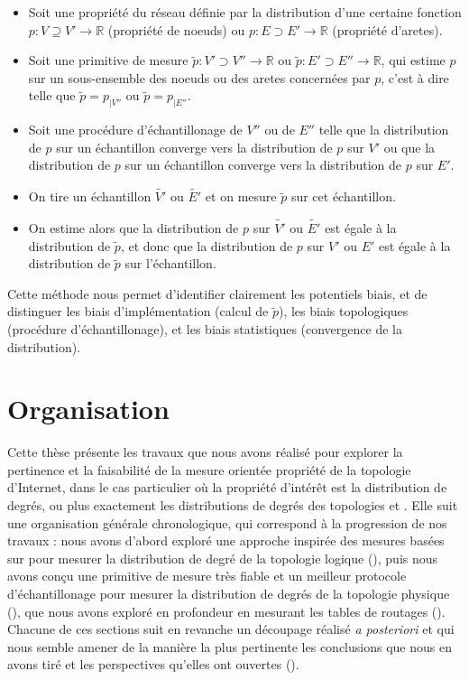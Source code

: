 \begin{itemize}
  \item Soit une propriété du réseau définie par la distribution d'une
  certaine fonction $p :
  V \supseteq V' \rightarrow {\mathbb R}$ (propriété de noeuds) ou $p : E
  \supset E' \rightarrow {\mathbb R}$ (propriété d'aretes).
  \item Soit une primitive de mesure $\tilde{p} : V' \supset V'' \rightarrow
  {\mathbb R}$ ou $\tilde{p} : E' \supset E'' \rightarrow {\mathbb R}$, qui
  estime $p$ sur un sous-ensemble des noeuds ou des aretes concernées par $p$,
  c'est à dire telle que $\tilde{p} = p_{|V''}$ ou $\tilde{p} = p_{|E''}$.
  \item Soit une procédure d'échantillonage de $V''$ ou de $E''$ telle que la
  distribution de $p$ sur un échantillon converge vers la distribution de
  $p$ sur $V'$ ou que la distribution de $p$ sur un échantillon converge vers la
  distribution de $p$ sur $E'$.
  \item On tire un échantillon $\tilde{V'}$ ou $\tilde{E'}$ et on mesure
  $\tilde{p}$ sur cet échantillon.
  \item On estime alors que la distribution de $p$ sur $\tilde{V'}$ ou
  $\tilde{E'}$ est égale à la distribution de $\tilde{p}$, et donc que la
  distribution de $p$ sur $V'$ ou $E'$ est égale à la distribution de
  $\tilde{p}$ sur l'échantillon.
\end{itemize}

Cette méthode nous permet d'identifier clairement les potentiels biais, et de
distinguer les biais d'implémentation (calcul de $\tilde{p}$), les biais
topologiques (procédure d'échantillonage), et les biais statistiques
(convergence de la distribution).

\section{Organisation}

Cette thèse présente les travaux que nous avons réalisé pour explorer la
pertinence et la faisabilité de la mesure orientée propriété de la topologie
d'Internet, dans le cas particulier où la propriété d'intérêt est la
distribution de degrés, ou plus exactement les distributions de degrés des
topologies \LL et \LLL.
Elle suit une organisation générale chronologique, qui correspond à la
progression de nos travaux : nous avons d'abord exploré une approche inspirée
des mesures basées sur \traceroute pour mesurer la distribution de degré de la
topologie logique (), puis nous avons conçu une primitive de
mesure très fiable et un meilleur protocole d'échantillonage pour mesurer la
distribution de degrés de la topologie physique (), que nous
avons exploré en profondeur en mesurant les tables de routages
(). Chacune de ces sections suit en revanche un découpage
réalisé {\em a posteriori} et qui nous semble amener de la manière la plus
pertinente les conclusions que nous en avons tiré et les perspectives qu'elles
ont ouvertes ().
